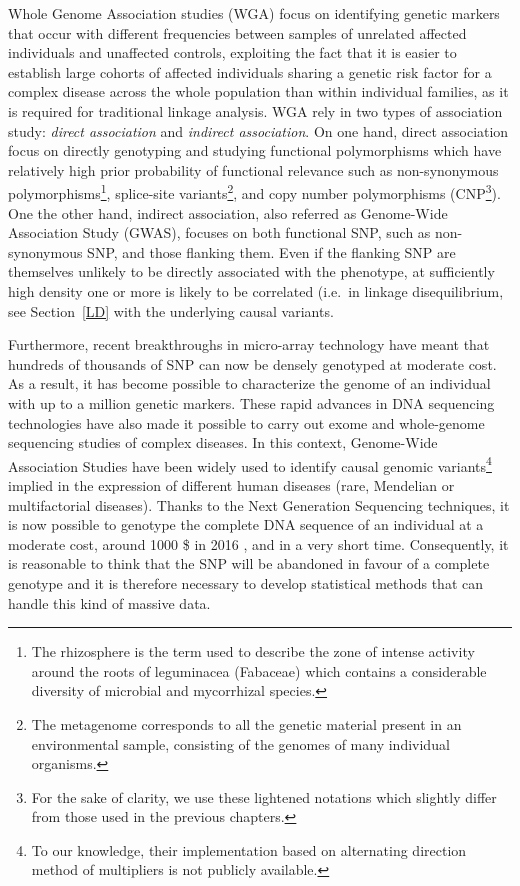 \documentclass[]{book}
\let\rmarkdownfootnote\footnote%
\def\footnote{\protect\rmarkdownfootnote}
\begin{document}
Whole Genome Association studies (WGA) focus on identifying genetic
markers that occur with different frequencies between samples of
unrelated affected individuals and unaffected controls, exploiting the
fact that it is easier to establish large cohorts of affected
individuals sharing a genetic risk factor for a complex disease across
the whole population than within individual families, as it is required
for traditional linkage analysis. WGA rely in two types of association
study: \emph{direct association} and \emph{indirect association}. On one hand,
direct association focus on directly genotyping and studying functional
polymorphisms which have relatively high prior probability of functional
relevance such as non-synonymous polymorphisms\footnote{The rhizosphere is the term used to describe the zone of intense
  activity around the roots of leguminacea (Fabaceae) which contains a
  considerable diversity of microbial and mycorrhizal species.}, splice-site
variants\footnote{The metagenome corresponds to all the genetic material present in
  an environmental sample, consisting of the genomes of many
  individual organisms.}, and copy number polymorphisms (CNP\footnote{For the sake of clarity, we use these lightened notations which
  slightly differ from those used in the previous chapters.}). One the other
hand, indirect association, also referred as Genome-Wide Association
Study (GWAS), focuses on both functional SNP, such as non-synonymous
SNP, and those flanking them. Even if the flanking SNP are themselves
unlikely to be directly associated with the phenotype, at sufficiently
high density one or more is likely to be correlated (i.e.~in linkage
disequilibrium, see Section~\ref{LD} with the underlying causal
variants.

Furthermore, recent breakthroughs in micro-array technology have meant
that hundreds of thousands of SNP can now be densely genotyped at
moderate cost. As a result, it has become possible to characterize the
genome of an individual with up to a million genetic markers. These
rapid advances in DNA sequencing technologies have also made it possible
to carry out exome and whole-genome sequencing studies of complex
diseases. In this context, Genome-Wide Association Studies have been
widely used to identify causal genomic variants\footnote{To our knowledge, their implementation based on alternating
  direction method of multipliers is not publicly available.} implied in the
expression of different human diseases (rare, Mendelian or
multifactorial diseases). Thanks to the Next Generation Sequencing
techniques, it is now possible to genotype the complete DNA sequence of
an individual at a moderate cost, around 1000 \$ in 2016 \citep{NGS}, and in
a very short time. Consequently, it is reasonable to think that the SNP
will be abandoned in favour of a complete genotype and it is therefore
necessary to develop statistical methods that can handle this kind of
massive data.
\end{document}
